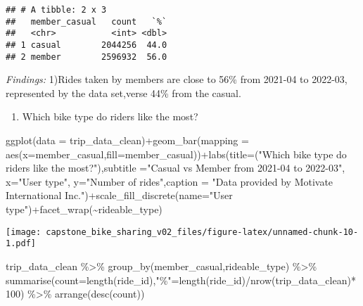 \documentclass[
]{article}
\newenvironment{Shaded}{\begin{snugshade}}{\end{snugshade}}
\newcommand{\AttributeTok}[1]{\textcolor[rgb]{0.77,0.63,0.00}{#1}}
\newcommand{\DecValTok}[1]{\textcolor[rgb]{0.00,0.00,0.81}{#1}}
\newcommand{\FunctionTok}[1]{\textcolor[rgb]{0.00,0.00,0.00}{#1}}
\newcommand{\NormalTok}[1]{#1}
\newcommand{\OtherTok}[1]{\textcolor[rgb]{0.56,0.35,0.01}{#1}}
\newcommand{\SpecialCharTok}[1]{\textcolor[rgb]{0.00,0.00,0.00}{#1}}
\newcommand{\StringTok}[1]{\textcolor[rgb]{0.31,0.60,0.02}{#1}}
\providecommand{\tightlist}{%
  \setlength{\itemsep}{0pt}\setlength{\parskip}{0pt}}
\begin{document}
\begin{verbatim}
## # A tibble: 2 x 3
##   member_casual   count   `%`
##   <chr>           <int> <dbl>
## 1 casual        2044256  44.0
## 2 member        2596932  56.0
\end{verbatim}

\emph{Findings:} 1)Rides taken by members are close to 56\% from 2021-04
to 2022-03, represented by the data set,verse 44\% from the casual.

\begin{enumerate}
\def\labelenumi{\arabic{enumi}.}
\setcounter{enumi}{1}
\tightlist
\item
  Which bike type do riders like the most?
\end{enumerate}

\begin{Shaded}
\begin{Highlighting}[]
\FunctionTok{ggplot}\NormalTok{(}\AttributeTok{data =}\NormalTok{ trip\_data\_clean)}\SpecialCharTok{+}\FunctionTok{geom\_bar}\NormalTok{(}\AttributeTok{mapping =} \FunctionTok{aes}\NormalTok{(}\AttributeTok{x=}\NormalTok{member\_casual,}\AttributeTok{fill=}\NormalTok{member\_casual))}\SpecialCharTok{+}\FunctionTok{labs}\NormalTok{(}\AttributeTok{title=}\NormalTok{(}\StringTok{"Which bike type do riders like the most?"}\NormalTok{),}\AttributeTok{subtitle =}\StringTok{"Casual vs Member from 2021{-}04 to 2022{-}03"}\NormalTok{, }\AttributeTok{x=}\StringTok{"User type"}\NormalTok{, }\AttributeTok{y=}\StringTok{"Number of rides"}\NormalTok{,}\AttributeTok{caption =} \StringTok{"Data provided by Motivate International Inc."}\NormalTok{)}\SpecialCharTok{+}\FunctionTok{scale\_fill\_discrete}\NormalTok{(}\AttributeTok{name=}\StringTok{"User type"}\NormalTok{)}\SpecialCharTok{+}\FunctionTok{facet\_wrap}\NormalTok{(}\SpecialCharTok{\textasciitilde{}}\NormalTok{rideable\_type)}
\end{Highlighting}
\end{Shaded}

\texttt{[image: capstone\_bike\_sharing\_v02\_files/figure-latex/unnamed-chunk-10-1.pdf]}

\begin{Shaded}
\begin{Highlighting}[]
\NormalTok{trip\_data\_clean }\SpecialCharTok{\%\textgreater{}\%} \FunctionTok{group\_by}\NormalTok{(member\_casual,rideable\_type) }\SpecialCharTok{\%\textgreater{}\%} \FunctionTok{summarise}\NormalTok{(}\AttributeTok{count=}\FunctionTok{length}\NormalTok{(ride\_id),}\StringTok{"\%"}\OtherTok{=}\FunctionTok{length}\NormalTok{(ride\_id)}\SpecialCharTok{/}\FunctionTok{nrow}\NormalTok{(trip\_data\_clean)}\SpecialCharTok{*}\DecValTok{100}\NormalTok{) }\SpecialCharTok{\%\textgreater{}\%} \FunctionTok{arrange}\NormalTok{(}\FunctionTok{desc}\NormalTok{(count))}
\end{Highlighting}
\end{Shaded}
\end{document}
